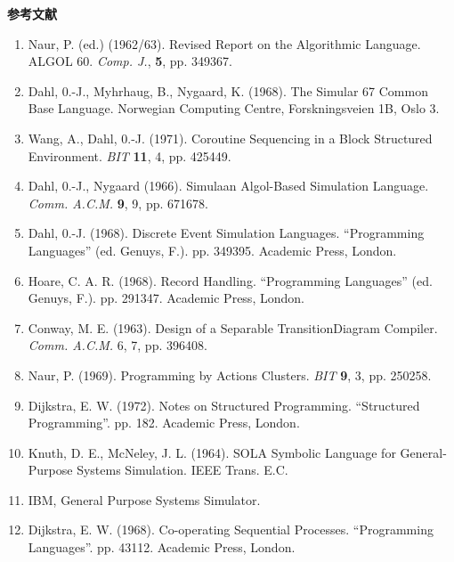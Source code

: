 \documentclass[twoside,11pt,fontset=none]{ctexbook}
\begin{document}
\bigskip

\noindent
\textbf{参考文献}
\medskip\nopagebreak

\begin{enumerate}[leftmargin=*, itemsep=.1em, wide=0pt, align=left, label=(\arabic*)]
	\item \label{ref:1}
	Naur, P. (ed.) (1962/63). Revised Report on the Algorithmic Language. ALGOL 60. \textit{Comp. J.}, \textbf{5}, pp. 349\textendash{}367.
	
	\item \label{ref:2}
	Dahl, 0.-J., Myhrhaug, B., Nygaard, K. (1968). The Simular 67 Common Base Language. Norwegian Computing Centre, Forskningsveien 1B, Oslo 3.
	
	\item \label{ref:3}
	Wang, A., Dahl, 0.-J. (1971). Coroutine Sequencing in a Block Structured Environment. \textit{BIT} \textbf{11}, 4, pp. 425\textendash{}449.
	
	\item \label{ref:4}
	Dahl, 0.-J., Nygaard (1966). Simula\textemdash{}an Algol-Based Simulation Language. \textit{Comm. A.C.M.} \textbf{9}, 9, pp. 671\textendash{}678. 
	
	\item \label{ref:5}
	Dahl, 0.-J. (1968). Discrete Event Simulation Languages. ``Programming Languages'' (ed. Genuys, F.). pp. 349\textendash{}395. Academic Press, London.
	
	\item \label{ref:6}
	Hoare, C. A. R. (1968). Record Handling. ``Programming Languages'' (ed. Genuys, F.). pp. 291\textendash{}347. Academic Press, London.
	
	\item \label{ref:7}
	Conway, M. E. (1963). Design of a Separable Transition\textemdash{}Diagram Compiler. \textit{Comm. A.C.M.} 6, 7, pp. 396\textendash{}408.
	
	\item \label{ref:8}
	Naur, P. (1969). Programming by Actions Clusters. \textit{BIT} \textbf{9}, 3, pp. 250\textendash{}258.
	
	\item \label{ref:9}
	Dijkstra, E. W. (1972). Notes on Structured Programming. ``Structured Programming''. pp. 1\textendash{}82. Academic Press, London.
	
	\item \label{ref:10}
	Knuth, D. E., McNeley, J. L. (1964). SOL\textemdash{}A Symbolic Language for General-Purpose Systems Simulation. IEEE Trans. E.C.
	
	\item \label{ref:11}
	IBM, General Purpose Systems Simulator.
	
	\item \label{ref:12}
	Dijkstra, E. W. (1968). Co-operating Sequential Processes. ``Programming Languages''. pp. 43\textendash{}112. Academic Press, London.
\end{enumerate}
\end{document}
